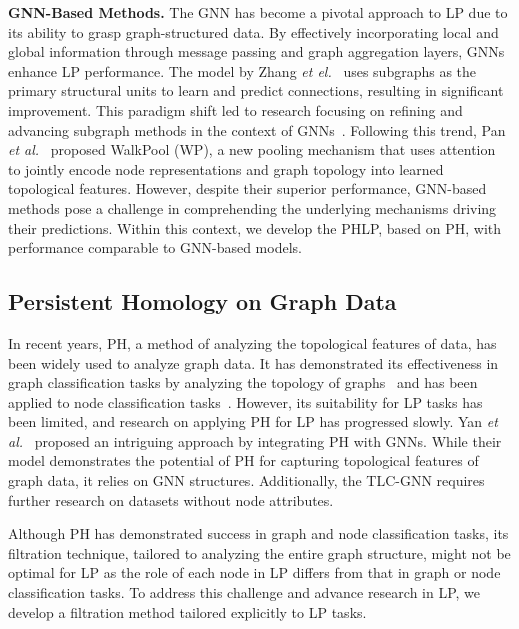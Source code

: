 \noindent\textbf{GNN-Based Methods.}
The GNN has become a pivotal approach to LP due to its ability to grasp graph-structured data. 
By effectively incorporating local and global information through message passing and graph aggregation layers, GNNs enhance LP performance.
The model by Zhang \textit{et el.}~\cite{zhang2018link} uses subgraphs as the primary structural units to learn and predict connections, resulting in significant improvement. 
This paradigm shift led to research focusing on refining and advancing subgraph methods in the context of GNNs~\cite{yun2021neo, mavromatis2020graph, pan2021neural}. 
Following this trend, Pan \textit{et al.}~\cite{pan2021neural} proposed WalkPool (WP), a new pooling mechanism that uses attention to jointly encode node representations and graph topology into learned topological features.
However, despite their superior performance, GNN-based methods pose a challenge in comprehending the underlying mechanisms driving their predictions.
Within this context,
we develop the PHLP, based on PH, with performance comparable to GNN-based models.

\subsection{Persistent Homology on Graph Data}
In recent years, PH, a method of analyzing the topological features of data, has been widely used to analyze graph data. 
It has demonstrated its effectiveness in graph classification tasks by analyzing the topology of graphs~\cite{horn2021topological, ye2023treph, carriere2020perslay, taiwo2024explaining, wen2024tensor, immonen2024going, ying2024boosting, zhao2019learning} and has been applied to node classification tasks~\cite{horn2021topological, chen2021topological, zhao2020persistence}. 
However, its suitability for LP tasks has been limited, and research on applying PH for LP has progressed slowly.
Yan \textit{et al.}~\cite{yan2021link} proposed an intriguing approach by integrating PH with GNNs. 
While their model demonstrates the potential of PH for capturing topological features of graph data, it relies on GNN structures.
Additionally, the TLC-GNN requires further research on datasets without node attributes.

Although PH has demonstrated success in graph and node classification tasks, its filtration technique, tailored to analyzing the entire graph structure, might not be optimal for LP as the role of each node in LP differs from that in graph or node classification tasks. 
To address this challenge and advance research in LP, we develop a filtration method tailored explicitly to LP tasks.
